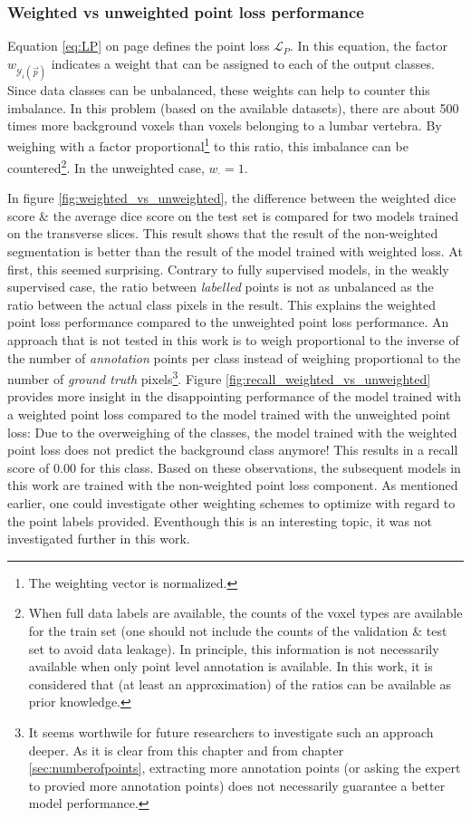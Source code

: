\subsubsection{Weighted vs unweighted point loss performance}
\par{
    Equation \ref{eq:LP} on page \pageref{eq:LP} defines the point loss $\mathcal{L}_P$. 
    In this equation, the factor $w_{\mathcal{Y}_i(\vec{p})}$ indicates a weight that can be assigned to each of the output classes.
    Since data classes can be unbalanced, these weights can help to counter this imbalance.
    In this problem (based on the available datasets), there are about 500 times more background voxels than voxels belonging to a lumbar vertebra.
    By weighing with a factor proportional\footnote{The weighting vector is normalized.} to this ratio, this imbalance can be countered\footnote{
        When full data labels are available, the counts of the voxel types are available for the train set (one should not include the counts of the validation \& test set to avoid data leakage).
        In principle, this information is not necessarily available when only point level annotation is available. In this work, it is considered that (at least an approximation) of the ratios can be available as prior knowledge.
    }. In the unweighted case, $w_{\cdot} = 1$.
}
\par{
    In figure \ref{fig:weighted_vs_unweighted}, the difference between the weighted dice score \& the average dice score on the test set is compared for two models trained on the transverse slices.
    This result shows that the result of the non-weighted segmentation is better than the result of the model trained with weighted loss.
    At first, this seemed surprising.
    Contrary to fully supervised models, in the weakly supervised case, the ratio between \textit{labelled} points is not as unbalanced as the ratio between the actual class pixels in the result.
    This explains the weighted point loss performance compared to the unweighted point loss performance.
    An approach that is not tested in this work is to weigh proportional to the inverse of the number of \textit{annotation} points per class instead of weighing proportional to the number of \textit{ground truth} pixels\footnote{
        It seems worthwile for future researchers to investigate such an approach deeper. 
        As it is clear from this chapter and from chapter \ref{sec:numberofpoints}, extracting more annotation points (or asking the expert to provied more annotation points) does not necessarily guarantee a better model performance.
    }.
    Figure \ref{fig:recall_weighted_vs_unweighted} provides more insight in the disappointing performance of the model trained with a weighted point loss compared to the model trained with the unweighted point loss:
    Due to the overweighing of the classes, the model trained with the weighted point loss does not predict the background class anymore! 
    This results in a recall score of 0.00 for this class.
    Based on these observations, the subsequent models in this work are trained with the non-weighted point loss component.
    As mentioned earlier, one could investigate other weighting schemes to optimize with regard to the point labels provided.
    Eventhough this is an interesting topic, it was not investigated further in this work.
}
